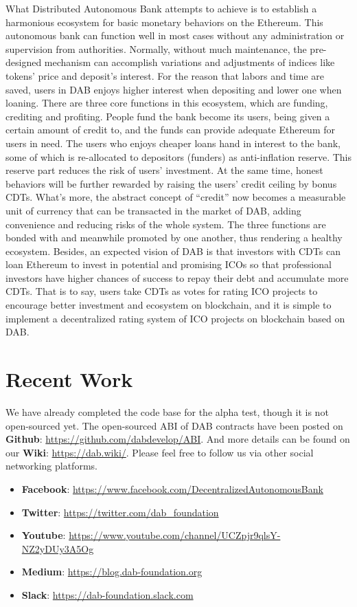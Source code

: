\documentclass[review]{elsarticle}
\begin{document}
What Distributed Autonomous Bank attempts to achieve is to establish a harmonious ecosystem for basic monetary behaviors on the Ethereum. This autonomous bank can function well in most cases without any administration or supervision from authorities. Normally, without much maintenance, the pre-designed mechanism can accomplish variations and adjustments of indices like tokens' price and deposit's interest. For the reason that labors and time are saved, users in DAB enjoys higher interest when depositing and lower one when loaning.
There are three core functions in this ecosystem, which are funding, crediting and profiting. People fund the bank become its users, being given a certain amount of credit to, and the funds can provide adequate Ethereum for users in need. The users who enjoys cheaper loans hand in interest to the bank, some of which is re-allocated to depositors (funders) as anti-inflation reserve. This reserve part reduces the risk of users' investment. At the same time, honest behaviors will be further rewarded by raising the users' credit ceiling by bonus CDTs. What's more, the abstract concept of ``credit'' now becomes a measurable unit of currency that can be transacted in the market of DAB, adding convenience and reducing risks of the whole system. The three functions are bonded with and meanwhile promoted by one another, thus rendering a healthy ecosystem.
Besides, an expected vision of DAB is that investors with CDTs can loan Ethereum to invest in potential and promising ICOs so that professional investors have higher chances of success to repay their debt and accumulate more CDTs. That is to say, users take CDTs as votes for rating ICO projects to encourage better investment and ecosystem on blockchain, and it is simple to implement a decentralized rating system of ICO projects on blockchain based on DAB.

\section{Recent Work}

We have already completed the code base for the alpha test, though it is not open-sourced yet. The open-sourced ABI of DAB contracts have been posted on \textbf{Github}: \underline{https://github.com/dabdevelop/ABI}. And more details can be found on our \textbf{Wiki}: \underline{https://dab.wiki/}. Please feel free to follow us via other social networking platforms.

\begin{itemize}
   \item \textbf{Facebook}: \underline{https://www.facebook.com/DecentralizedAutonomousBank}
   \item \textbf{Twitter}: \underline{https://twitter.com/dab\_foundation}
   \item \textbf{Youtube}: \underline{https://www.youtube.com/channel/UCZpjr9qlsY-NZ2yDUy3A5Og}
   \item \textbf{Medium}: \underline{https://blog.dab-foundation.org}
   \item \textbf{Slack}: \underline{https://dab-foundation.slack.com}
\end{itemize}
\end{document}
